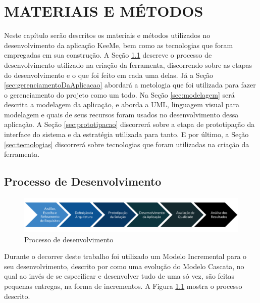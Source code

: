 
\chapter{MATERIAIS E MÉTODOS}
\label{chap:metodologia}
Neste capítulo serão descritos os materiais e métodos utilizados no desenvolvimento da aplicação KeeMe, bem como as tecnologias que foram empregadas em sua construção. A Seção \ref{sec:desenvolvimento} descreve o processo de desenvolvimento utilizado na criação da ferramenta, discorrendo sobre as etapas do desenvolvimento e o que foi feito em cada uma delas. Já a Seção \ref{sec:gerenciamentoDaAplicacao} abordará a metologia que foi utilizada para fazer o gerenciamento do projeto como um todo. Na Seção \ref{sec:modelagem} será descrita a modelagem da aplicação, e aborda a UML, linguagem visual para modelagem e quais de seus recursos foram usados no desenvolvimento dessa aplicação. A Seção \ref{sec:prototipacao} discorrerá sobre a etapa de prototipação da interface do sistema e da estratégia utilizada para tanto. E por último, a Seção \ref{sec:tecnologias} discorrerá sobre tecnologias que foram utilizadas na criação da ferramenta.

\section{Processo de Desenvolvimento}
\label{sec:desenvolvimento}

\begin{figure}[H]
    \centering
    \includegraphics[width=\textwidth]{dados/figuras/Metodologia/grafico_evolutivo.pdf}
    \caption{Processo de desenvolvimento}
    \label{fig:processoDeDesenvolvimento}
\end{figure}

Durante o decorrer deste trabalho foi utilizado um Modelo Incremental para o seu desenvolvimento, descrito por \cite{dias2019__modelo_incremental} como uma evolução do Modelo Cascata, no qual ao invés de se especificar e desenvolver tudo de uma só vez, são feitas pequenas entregas, na forma de incrementos. A Figura \ref{fig:processoDeDesenvolvimento} mostra o processo descrito.

